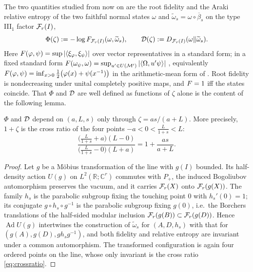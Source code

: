 \label{sec:fidelity}
The two quantities studied from now on are the root fidelity and the Araki
relative entropy of the two faithful normal states $\omega$ and
$\widetilde\omega_s=\omega\circ\overline\beta_s$ on the type III$_1$ factor
$\mathcal F_r(I)$,
\begin{equation}\label{eq:targets}
 \Phi(\zeta):=-\log F_{\mathcal F_r(I)}(\omega,\widetilde\omega_s),
 \qquad
 \mathcal D(\zeta):=D_{\mathcal F_r(I)}(\omega\Vert\widetilde\omega_s).
\end{equation}
Here $F(\varphi,\psi)=\sup|\langle\xi_\varphi,\xi_\psi\rangle|$ over vector
representatives in a standard form; in a fixed standard form
$F(\omega_\psi,\omega)=\sup_{u'\in U(\mathcal M')}|\langle\Omega,u'\psi\rangle|$
\cite[Thm.~2(3)]{AU02}, equivalently
$F(\varphi,\psi)=\inf_{x>0}\frac12\bigl(\varphi(x)+\psi(x^{-1})\bigr)$
\cite[Thm.~2]{AU02} in the arithmetic-mean form of \cite{Uhl11}.  Root fidelity is
nondecreasing under unital completely positive maps, and $F=1$ iff the states
coincide.  That $\Phi$ and $\mathcal D$ are well defined as functions of $\zeta$ alone is
the content of the following lemma.

\begin{lemma}\label{lem:mobius}
$\Phi$ and $\mathcal D$ depend on $(a,L,s)$ only through $\zeta=as/(a+L)$.  More
precisely, $1+\zeta$ is the cross ratio of the four points
$-a<0<\frac L{1+s}<L$:
\begin{equation}\label{eq:crossratio}
 \frac{\bigl(\frac L{1+s}+a\bigr)(L-0)}{\bigl(\frac L{1+s}-0\bigr)(L+a)}
 =1+\frac{as}{a+L} .
\end{equation}
\end{lemma}

\begin{proof}
Let $g$ be a M\"obius transformation of the line with $g(I)$ bounded.  Its
half-density action $U(g)$ on $L^2(\mathbb R;\mathbb C^r)$ commutes with $P_+$, the
induced Bogoliubov automorphism preserves the vacuum, and it carries $\mathcal F_r(X)$
onto $\mathcal F_r(g(X))$.  The family $h_s$ is the parabolic subgroup fixing the
touching point $0$ with $h_s'(0)=1$; its conjugate $g\circ h_s\circ g^{-1}$ is the
parabolic subgroup fixing $g(0)$, i.e.\ the Borchers translations of the
half-sided modular inclusion $\mathcal F_r(g(B))\subset\mathcal F_r(g(D))$.  Hence
$\operatorname{Ad}U(g)$ intertwines the construction of $\widetilde\omega_s$ for
$(A,D,h_s)$ with that for $(g(A),g(D),gh_sg^{-1})$, and both fidelity and relative
entropy are invariant under a common automorphism.  The transformed configuration
is again four ordered points on the line, whose only invariant is the cross ratio
\eqref{eq:crossratio}.
\end{proof}

